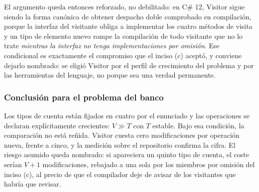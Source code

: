 El argumento queda entonces reforzado, no debilitado: en C\# 12, Visitor sigue siendo la forma
canónica de obtener despacho doble comprobado en compilación, porque la interfaz del visitante
obliga a implementar los cuatro métodos de visita y un tipo de elemento nuevo rompe la
compilación de todo visitante que no lo trate \emph{mientras la interfaz no tenga
implementaciones por omisión}. Ese condicional es exactamente el compromiso que el inciso (c)
aceptó, y conviene dejarlo nombrado: se eligió Visitor por el perfil de crecimiento del
problema y por las herramientas del lenguaje, no porque sea una verdad permanente.

\subsubsection*{Conclusión para el problema del banco}

Los tipos de cuenta están fijados en cuatro por el enunciado y las operaciones se declaran
explícitamente crecientes: $V \gg T$ con $T$ estable. Bajo esa condición, la comparación no
está reñida. Visitor cuesta cero modificaciones por operación nueva, frente a cinco, y la
medición sobre el repositorio confirma la cifra. El riesgo asumido queda nombrado: si
apareciera un quinto tipo de cuenta, el coste serían $V+1$ modificaciones, rebajado a una sola
por los miembros por omisión del inciso (c), al precio de que el compilador deje de avisar
de los visitantes que habría que revisar.

\fussy

